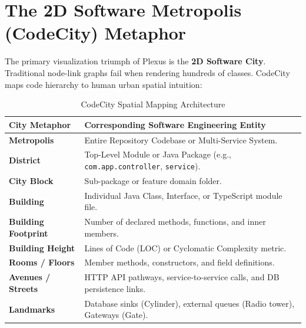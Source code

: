 \documentclass[11pt,a4paper,openany]{report}
\begin{document}
\section{The 2D Software Metropolis (CodeCity) Metaphor}
The primary visualization triumph of Plexus is the \textbf{2D Software City}. Traditional node-link graphs fail when rendering hundreds of classes. CodeCity maps code hierarchy to human urban spatial intuition:

\begin{table}[htbp]
\centering
\small
\begin{tabularx}{\textwidth}{l X}
\toprule
\textbf{City Metaphor} & \textbf{Corresponding Software Engineering Entity} \\
\midrule
\textbf{Metropolis} & Entire Repository Codebase or Multi-Service System. \\
\textbf{District} & Top-Level Module or Java Package (e.g., \texttt{com.app.controller}, \texttt{service}). \\
\textbf{City Block} & Sub-package or feature domain folder. \\
\textbf{Building} & Individual Java Class, Interface, or TypeScript module file. \\
\textbf{Building Footprint} & Number of declared methods, functions, and inner members. \\
\textbf{Building Height} & Lines of Code (LOC) or Cyclomatic Complexity metric. \\
\textbf{Rooms / Floors} & Member methods, constructors, and field definitions. \\
\textbf{Avenues / Streets} & HTTP API pathways, service-to-service calls, and DB persistence links. \\
\textbf{Landmarks} & Database sinks (Cylinder), external queues (Radio tower), Gateways (Gate). \\
\bottomrule
\end{tabularx}
\caption{CodeCity Spatial Mapping Architecture}
\label{tab:codecity-metaphor}
\end{table}
\end{document}
